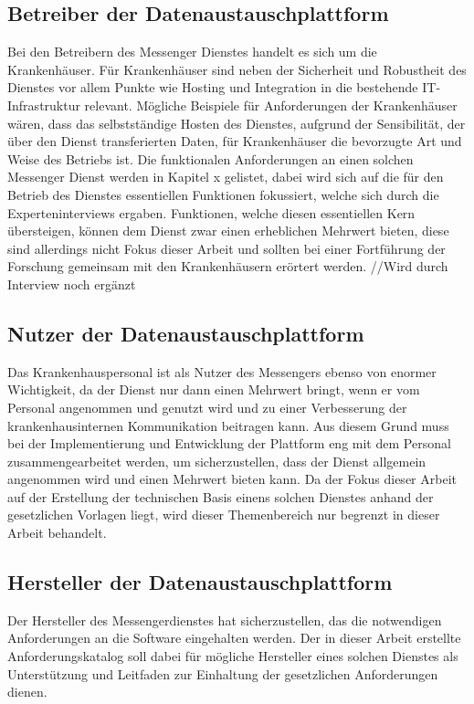 \subsection{Betreiber der Datenaustauschplattform}\label{subsection:bdd}
Bei den Betreibern des Messenger Dienstes handelt es sich um die Krankenhäuser. Für Krankenhäuser sind neben der Sicherheit und Robustheit des Dienstes vor allem Punkte wie Hosting und Integration in die bestehende IT-Infrastruktur relevant.
Mögliche Beispiele für Anforderungen der Krankenhäuser wären, dass das selbstständige Hosten des Dienstes, aufgrund der Sensibilität, der über den Dienst transferierten Daten, für Krankenhäuser die bevorzugte Art und Weise des Betriebs ist. Die funktionalen Anforderungen an einen solchen Messenger Dienst werden in Kapitel x gelistet, dabei wird sich auf die für den Betrieb des Dienstes essentiellen Funktionen fokussiert, welche sich durch die Experteninterviews ergaben. Funktionen, welche diesen essentiellen Kern übersteigen, können dem Dienst zwar einen erheblichen Mehrwert bieten, diese sind allerdings nicht Fokus dieser Arbeit und sollten bei einer Fortführung der Forschung gemeinsam mit den Krankenhäusern erörtert werden.
//Wird durch Interview noch ergänzt

\subsection{Nutzer der Datenaustauschplattform}\label{subsection:ndd}
Das Krankenhauspersonal ist als Nutzer des Messengers ebenso von enormer Wichtigkeit, da der Dienst nur dann einen Mehrwert bringt, wenn er vom Personal angenommen und genutzt wird und zu einer Verbesserung der krankenhausinternen Kommunikation beitragen kann. Aus diesem Grund muss bei der Implementierung und Entwicklung der Plattform eng mit dem Personal zusammengearbeitet werden, um sicherzustellen, dass der Dienst allgemein angenommen wird und einen Mehrwert bieten kann. Da der Fokus dieser Arbeit auf der Erstellung der technischen Basis einens solchen Dienstes anhand der gesetzlichen Vorlagen liegt, wird dieser Themenbereich nur begrenzt in dieser Arbeit behandelt. 

\subsection{Hersteller der Datenaustauschplattform}\label{subsection:hdd}
Der Hersteller des Messengerdienstes hat sicherzustellen, das die notwendigen Anforderungen an die Software eingehalten werden.
Der in dieser Arbeit erstellte Anforderungskatalog soll dabei für mögliche Hersteller eines solchen Dienstes als Unterstützung und Leitfaden zur Einhaltung der gesetzlichen Anforderungen dienen.

